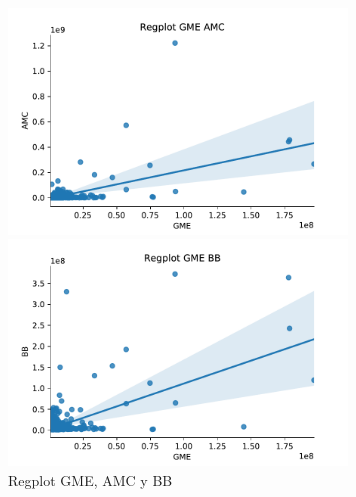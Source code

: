 \documentclass[12pt,twoside]{report}
\begin{document}
\begin{figure}[H]
\begin{multicols}{2}
    \includegraphics[width=9cm]{../code/figures/regplot_GME_AMC.pdf}\par 
    \includegraphics[width=9cm]{../code/figures/regplot_GME_BB.pdf}\par 
\end{multicols}
\caption{Regplot GME, AMC y BB}
\label{fig:regplot-1}
\end{figure}
\end{document}
